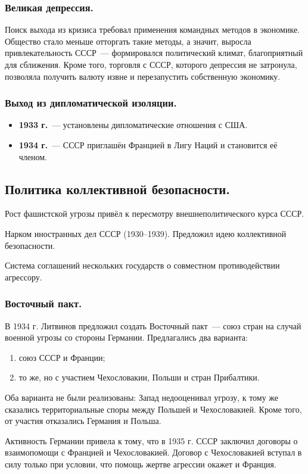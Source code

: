 \documentclass[12pt]{article}
\begin{document}
	\subsubsection{Великая депрессия.}
	Поиск выхода из кризиса требовал применения командных методов в экономике. Общество стало меньше отторгать такие методы, а значит, выросла привлекательность СССР~--- формировался политический климат, благоприятный для сближения. Кроме того, торговля с СССР, которого депрессия не затронула, позволяла получить валюту извне и перезапустить собственную экономику.

	\subsubsection{Выход из дипломатической изоляции.}
	\begin{itemize}
		\item \textbf{1933 г.}~--- установлены дипломатические отношения с США.
		\item \textbf{1934 г.}~--- СССР приглашён Францией в Лигу Наций и становится её членом.
	\end{itemize}

	\subsection{Политика коллективной безопасности.}
	Рост фашистской угрозы привёл к пересмотру внешнеполитического курса СССР.
	\begin{person}[М.М. Литвинов]
		Нарком иностранных дел СССР (1930--1939). Предложил идею коллективной безопасности.
	\end{person}
	\begin{definition}
		Система соглашений нескольких государств о совместном противодействии агрессору.
	\end{definition}

	\subsubsection{Восточный пакт.}
	В 1934 г. Литвинов предложил создать Восточный пакт~--- союз стран на случай военной угрозы со стороны Германии. Предлагались два варианта:
	\begin{enumerate}
		\item союз СССР и Франции;
		\item то же, но с участием Чехословакии, Польши и стран Прибалтики.
	\end{enumerate}
	Оба варианта не были реализованы: Запад недооценивал угрозу, к тому же сказались территориальные споры между Польшей и Чехословакией. Кроме того, от участия отказались Германия и Польша.
	\begin{note}
		Активность Германии привела к тому, что в 1935 г. СССР заключил договоры о взаимопомощи с Францией и Чехословакией. Договор с Чехословакией вступал в силу только при условии, что помощь жертве агрессии окажет и Франция.
	\end{note}
\end{document}
